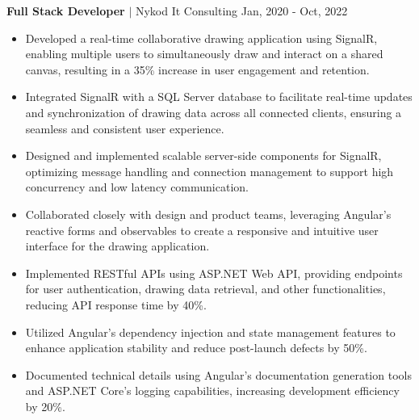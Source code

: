 \documentclass{article}
\begin{document}
\textbf{Full Stack Developer} $|$ Nykod It Consulting \hfill {Jan, 2020 - Oct, 2022}
\vspace{-5pt}
\begin{itemize}[ leftmargin=15pt, itemsep=-5pt]
\item Developed a real-time collaborative drawing application using SignalR, enabling multiple users to simultaneously draw and interact on a shared canvas, resulting in a 35\% increase in user engagement and retention.
\item Integrated SignalR with a SQL Server database to facilitate real-time updates and synchronization of drawing data across all connected clients, ensuring a seamless and consistent user experience.
\item Designed and implemented scalable server-side components for SignalR, optimizing message handling and connection management to support high concurrency and low latency communication.
\item Collaborated closely with design and product teams, leveraging Angular's reactive forms and observables to create a responsive and intuitive user interface for the drawing application.
\item Implemented RESTful APIs using ASP.NET Web API, providing endpoints for user authentication, drawing data retrieval, and other functionalities, reducing API response time by 40\%.
\item Utilized Angular's dependency injection and state management features to enhance application stability and reduce post-launch defects by 50\%.
\item Documented technical details using Angular's documentation generation tools and ASP.NET Core's logging capabilities, increasing development efficiency by 20\%.
\end{itemize}



\end{document}
